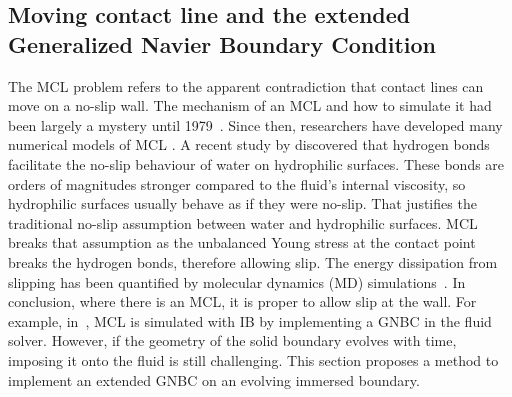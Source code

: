 \documentclass{jfm}
\begin{document}
\subsection{Moving contact line and the extended Generalized Navier Boundary Condition} \label{subsec:mcl}
The MCL problem refers to the apparent contradiction that contact lines can move on a no-slip wall. The mechanism of an MCL and how to simulate it had been largely a mystery until 1979~\citep{dussan1979spreading}. Since then, researchers have developed many numerical models of MCL \citep{sui2014numerical, liu2015diffuse}. A recent study by \citet{johansson2015water} discovered that hydrogen bonds facilitate the no-slip behaviour of water on hydrophilic surfaces. These bonds are orders of magnitudes stronger compared to the fluid's internal viscosity, so hydrophilic surfaces usually behave as if they were no-slip. That justifies the traditional no-slip assumption between water and hydrophilic surfaces. MCL breaks that assumption as the unbalanced Young stress at the contact point breaks the hydrogen bonds, therefore allowing slip. The energy dissipation from slipping has been quantified by molecular dynamics (MD) simulations~\citep{johansson2018molecular}. In conclusion, where there is an MCL, it is proper to allow slip at the wall. For example, in~\citep{lai2010numerical}, MCL is simulated with IB by implementing a GNBC in the fluid solver. However, if the geometry of the solid boundary evolves with time, imposing it onto the fluid is still challenging. This section proposes a method to implement an extended GNBC on an evolving immersed boundary. 
\end{document}
